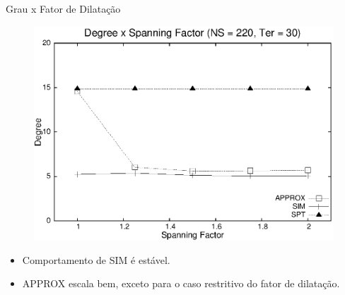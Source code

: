 \documentclass[10pt]{beamer}
\begin{document}
\begin{frame}{Grau x Fator de Dilatação}
\begin{figure}[H]
\centering
\includegraphics[scale=0.60]{imagens/defesa-grau_sf}
\label{fig:grau_sf}
\end{figure}
\begin{itemize}
  \item Comportamento de SIM é estável.
  \item APPROX escala bem, exceto para o caso restritivo do fator de dilatação.
\end{itemize}
\end{frame}
\end{document}
